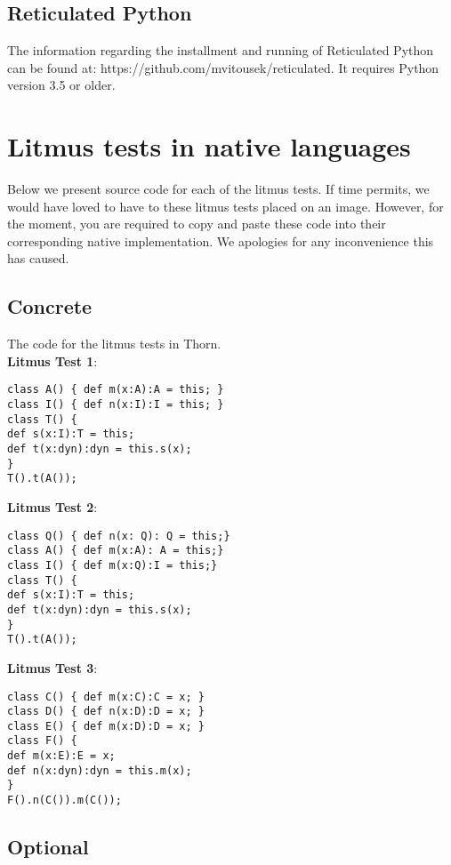 \documentclass[]{article}
\begin{document}
\subsection{Reticulated Python}

The information regarding the installment and running of Reticulated Python can be found at: https://github.com/mvitousek/reticulated. It requires Python version 3.5 or older. 


\section{Litmus tests in native languages}

Below we present source code for each of the litmus tests. If time permits, we would have loved to have to these litmus tests placed on an image. However, for the moment, you are required to copy and paste these code into their corresponding native implementation. We apologies for any inconvenience this has caused. 

\subsection*{Concrete}

The code for the litmus tests in Thorn. \\ 

\noindent
\textbf{Litmus Test 1}:
\begin{verbatim}
class A() { def m(x:A):A = this; }
class I() { def n(x:I):I = this; }
class T() {
def s(x:I):T = this;
def t(x:dyn):dyn = this.s(x);
}
T().t(A());
\end{verbatim}

\noindent
\textbf{Litmus Test 2}:
\begin{verbatim}
class Q() { def n(x: Q): Q = this;}
class A() { def m(x:A): A = this;}
class I() { def m(x:Q):I = this;}
class T() {
def s(x:I):T = this; 
def t(x:dyn):dyn = this.s(x);
}
T().t(A());   
\end{verbatim}


\noindent\textbf{Litmus Test 3}:
\begin{verbatim}
class C() { def m(x:C):C = x; }
class D() { def n(x:D):D = x; }
class E() { def m(x:D):D = x; }      
class F() {
def m(x:E):E = x;
def n(x:dyn):dyn = this.m(x);
} 
F().n(C()).m(C());
\end{verbatim}

\subsection*{Optional}
\end{document}

